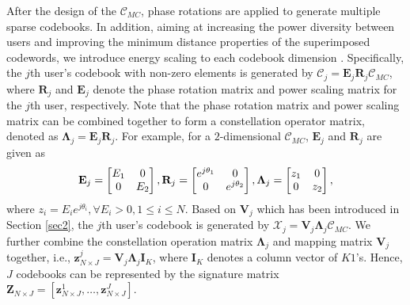 \documentclass[journal]{IEEEtran}
\begin{document}
After   the design of the   $\boldsymbol {\mathcal C}_{MC}$,  phase rotations  are applied to generate multiple sparse codebooks.      In addition,  aiming at increasing the power diversity between users and improving the minimum distance properties   of the superimposed codewords, we introduce energy scaling to each codebook dimension   \cite{li2020design}. Specifically, the $j$th user's codebook with non-zero elements is generated by  $ \boldsymbol {\mathcal C}_{j} = \mathbf{E}_j \mathbf{R}_j  \boldsymbol {\mathcal C}_{MC}$, where $\mathbf{R}_j$ and $\mathbf{E}_j$ denote  the phase rotation matrix and power scaling matrix for the $j$th user, respectively. Note that the phase rotation matrix and power scaling matrix can be combined together to form a constellation operator matrix, denoted as $\mathbf{\Lambda}_j =\mathbf{E}_j \mathbf{R}_j$. For example, for a $2$-dimensional $\boldsymbol {\mathcal C}_{MC}$, $\mathbf{E}_j$ and $\mathbf{R}_j $ are given as \begin{equation}
 \begin{aligned}
 \small
 \label{delta}
 \mathbf{E}_j=\left[ \begin{matrix}
   E_1   &  0 \\
     0   &    E_2
\end{matrix} \right],
\mathbf{R}_j=\left[ \begin{matrix}
   e^{j \theta _1}   &  0 \\
     0   &     e^{j \theta _2} 
\end{matrix} \right],
\mathbf{\Lambda}_j=\left[ \begin{matrix}
   z_1   &  0 \\
     0   &    z_2
\end{matrix} \right],
 \end{aligned}
\end{equation}
   where $z_i = E_ie^{j \theta_i}, \forall  E_i >0,  1\leq i \leq N$. Based on $\mathbf{V}_j$  which has been introduced in Section \ref{sec2},  the $j$th user's codebook   is generated by $\boldsymbol{\mathcal X}_{j} = \mathbf {V}_{j} \mathbf{\Lambda}_j \boldsymbol {\mathcal C}_{MC}$.  We further combine the constellation operation matrix $\mathbf{\Lambda}_j$  and mapping matrix $\mathbf {V}_{j}$ together, i.e., $\mathbf{z}_{N \times J}^j =\mathbf {V}_{j} \mathbf{\Lambda}_j \mathbf{I}_K$, where $\mathbf{I}_K$ denotes a column vector  of $K 1$'s. Hence, $J$ codebooks  can be represented by the signature matrix  $\mathbf{Z}_{N \times J}= \left[ \mathbf{z}_{N \times J}^1, \dots, \mathbf{z}_{N \times J}^J \right]$.
\end{document}

